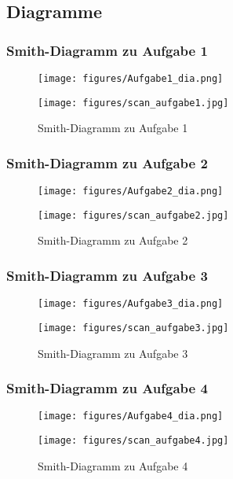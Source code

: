 \documentclass[12pt,a4paper,ngerman]{article}
\begin{document}
\pagebreak
\subsection{Diagramme}
\subsubsection{Smith-Diagramm zu Aufgabe 1}
\begin{figure}[h!]
\centering
\texttt{[image: figures/Aufgabe1\_dia.png]} 

\end{figure}

\pagebreak
\begin{figure}[h!]
\centering
\texttt{[image: figures/scan\_aufgabe1.jpg]} 
\caption{Smith-Diagramm zu Aufgabe 1}
\end{figure}
\pagebreak
\subsubsection{Smith-Diagramm zu Aufgabe 2}
\begin{figure}[h!]
\centering
\texttt{[image: figures/Aufgabe2\_dia.png]} 

\end{figure}
\pagebreak
\pagebreak
\begin{figure}[h!]
\centering
\texttt{[image: figures/scan\_aufgabe2.jpg]} 
\caption{Smith-Diagramm zu Aufgabe 2}
\end{figure}
\subsubsection{Smith-Diagramm zu Aufgabe 3}
\begin{figure}[h!]
\centering
\texttt{[image: figures/Aufgabe3\_dia.png]} 

\end{figure}
\pagebreak
\begin{figure}[h!]
\centering
\texttt{[image: figures/scan\_aufgabe3.jpg]} 
\caption{Smith-Diagramm zu Aufgabe 3}
\end{figure}
\pagebreak
\subsubsection{Smith-Diagramm zu Aufgabe 4}
\begin{figure}[h!]
\centering
\texttt{[image: figures/Aufgabe4\_dia.png]} 
\end{figure}
\pagebreak
\begin{figure}[h!]
\centering
\texttt{[image: figures/scan\_aufgabe4.jpg]} 
\caption{Smith-Diagramm zu Aufgabe 4}
\end{figure}
\end{document}
